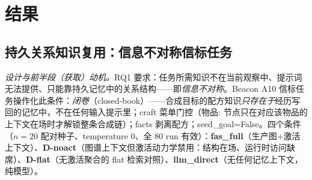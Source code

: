 \documentclass[10pt,a4paper]{ctexart}
\begin{document}
\section{结果}
\label{sec:results}

\subsection{持久关系知识复用：信息不对称信标任务}
\label{sec:res-reuse}
\emph{设计与前半段（获取）动机。}RQ1 要求：任务所需知识不在当前观察中、提示词无法提供、只能靠持久记忆中的关系结构——即\emph{信息不对称}。Beacon A10 信标任务操作化此条件：\emph{闭卷}（closed-book）——合成目标的配方知识\emph{只存在于}经历写回的记忆中，不在任何输入提示里；craft 菜单门控（物品: 节点只在对应该物品的上下文在场时才解锁整条合成链）；facts 剥离配方；seed\_goal=False。四个条件（$n{=}20$ 配对种子、temperature 0、全 80 run 有效）：\textbf{fas\_full}（生产图+激活上下文）、\textbf{D-noact}（图谱上下文但激活动力学禁用：结构在场、运行时访问缺席）、\textbf{D-flat}（无激活聚合的 flat 检索对照）、\textbf{llm\_direct}（无任何记忆上下文，纯模型）。
\end{document}

